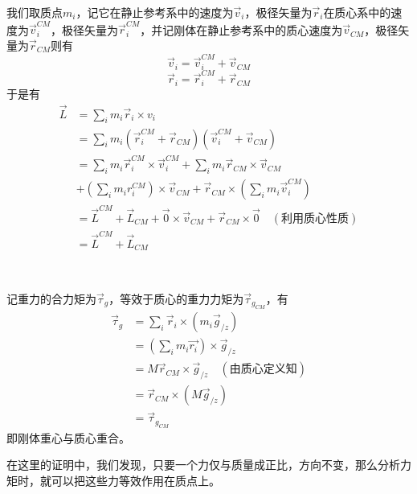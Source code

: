 \begin{prove}[$\vec{L}=\vec{L}_{CM}+\vec{L}^{CM}$]
	我们取质点$m_i$，记它在静止参考系中的速度为$\vec{v}_i$，极径矢量为$\vec{r}_i$在质心系中的速度为$\vec{v}^{CM}_i$，极径矢量为$\vec{r}_i^{CM}$，并记刚体在静止参考系中的质心速度为$\vec{v}_{CM}$，极径矢量为$\vec{r}_{CM}$则有
	\[\vec{v}_i=\vec{v}_i^{CM}+\vec{v}_{CM}\]
	\[\vec{r}_i=\vec{r}_i^{CM}+\vec{r}_{CM}\]
	于是有
	\begin{align*}
		\vec{L}&=\sum_im_i\vec{r}_i\times v_i\\
		&=\sum_im_i(\vec{r}_i^{CM}+\vec{r}_{CM})(\vec{v}_i^{CM}+\vec{v}_{CM})\\
		&=\sum_im_i\vec{r}_i^{CM}\times\vec{v}_i^{CM}+\sum_im_i\vec{r}_{CM}\times\vec{v}_{CM}\\
		&+(\sum_im_ir_i^{CM})\times\vec{v}_{CM}+\vec{r}_{CM}\times(\sum_im_i\vec{v}_i^{CM})\\
		&=\vec{L}^{CM}+\vec{L}_{CM}+\vec{0}\times\vec{v}_{CM}+\vec{r}_{CM}\times\vec{0}\quad(\text{利用质心性质})\\
		&=\vec{L}^{CM}+\vec{L}_{CM}
	\end{align*}
\end{prove}
\newpage
\quad\\
\begin{prove}
	记重力的合力矩为$\vec{\tau}_{g}$，等效于质心的重力力矩为$\vec{\tau}_{g_{CM}}$，有
	\begin{align*}
		\vec{\tau}_g&=\sum_i\vec{r}_i\times(m_i\vec{g}_{/z})\\
		&=(\sum_im_i\vec{r_i})\times\vec{g}_{/z}\\
		&=M\vec{r}_{CM}\times\vec{g}_{/z}\quad(\text{由质心定义知})\\
		&=\vec{r}_{CM}\times(M\vec{g}_{/z})\\
		&=\vec{\tau}_{g_{CM}}
	\end{align*}
	即刚体重心与质心重合。
	
	在这里的证明中，我们发现，只要一个力仅与质量成正比，方向不变，那么分析力矩时，就可以把这些力等效作用在质点上。
\end{prove}
